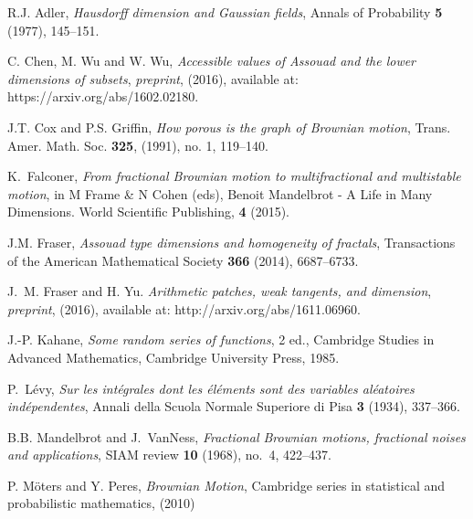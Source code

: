 \documentclass{amsart}
\begin{document}
\providecommand{\bysame}{\leavevmode\hbox to3em{\hrulefill}\thinspace}
\providecommand{\MR}{\relax\ifhmode\unskip\space\fi MR }
\providecommand{\MRhref}[2]{%
	\href{http://www.ams.org/mathscinet-getitem?mr=#1}{#2}
}
\providecommand{\href}[2]{#2}
\begin{thebibliography}{Kah85}
	
	R.J. Adler, \emph{Hausdorff dimension and Gaussian fields},
	Annals of Probability \textbf{5} (1977),
	145--151.
    
	C. Chen, M. Wu and W. Wu, \emph{Accessible values of Assouad and the lower dimensions of subsets},
    \emph{preprint}, (2016), available at: https://arxiv.org/abs/1602.02180.
    
	J.T. Cox and P.S. Griffin, \emph{How porous is the graph of Brownian motion},
	Trans. Amer. Math. Soc. \textbf{325}, (1991), no. 1,
	119--140.
    
	K.~Falconer, \emph{From fractional Brownian motion to multifractional and
		multistable motion}, in M Frame \& N Cohen (eds), Benoit Mandelbrot - A Life in Many Dimensions. World Scientific Publishing, \textbf{4} (2015).
	
	J.M. Fraser, \emph{Assouad type dimensions and homogeneity of fractals},
	Transactions of the American Mathematical Society \textbf{366} (2014),
	6687--6733.
	
	J.~M. Fraser and H. Yu.
	\emph{Arithmetic patches, weak tangents, and dimension},
	{\em preprint}, (2016),   available at: http://arxiv.org/abs/1611.06960.
	
	J.-P. Kahane, \emph{Some random series of functions}, 2 ed., Cambridge Studies
	in Advanced Mathematics, Cambridge University Press, 1985.
	
	P.~L{\'{e}}vy, \emph{Sur les int{\'e}grales dont les {\'e}l{\'e}ments sont des variables al{\'e}atoires ind{\'e}pendentes}, Annali della Scuola Normale Superiore di Pisa
	\textbf{3} (1934), 337--366.
		
	B.B. Mandelbrot and J.~VanNess, \emph{Fractional Brownian motions, fractional
		noises and applications}, SIAM review \textbf{10} (1968), no.~4, 422--437.
	
	P. M\"{o}ters and Y. Peres, \emph{Brownian Motion}, Cambridge series in statistical and probabilistic mathematics, (2010)
    

\end{thebibliography}
\end{document}
